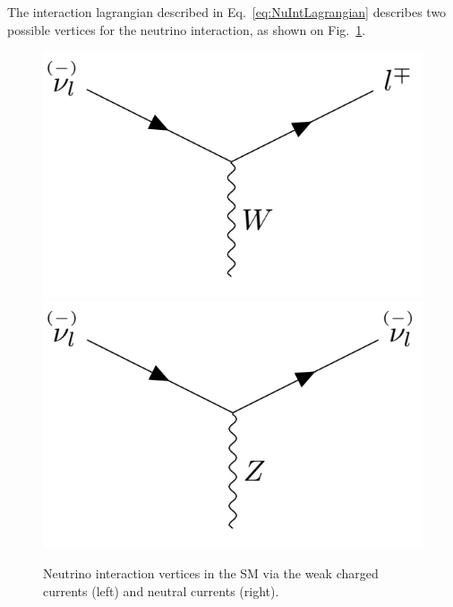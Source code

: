 
The interaction lagrangian described in Eq.~\ref{eq:NuIntLagrangian} describes two possible vertices for the neutrino interaction, as shown on Fig.~\ref{fig:FeynmanNuIntVertices}.

\begin{figure}[hbtp]
\centering
\includegraphics[width=0.4\linewidth]{Plots/Theory/NeutrinoCCInteractionVertices.png}
\hspace{0.1\linewidth}
\includegraphics[width=0.4\linewidth]{Plots/Theory/NeutrinoNCInteractionVertices.png}
\caption[Neutrino interaction vertices in the SM]{Neutrino interaction vertices in the \acrshort{SM} via the weak charged currents (left) and neutral currents (right).}
\label{fig:FeynmanNuIntVertices}
\end{figure}





